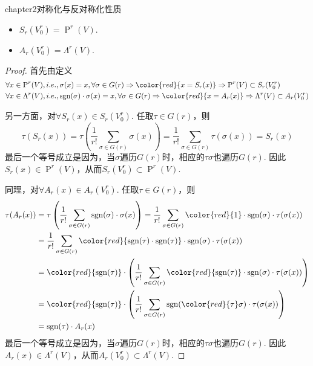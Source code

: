 \begin{mythm}{}{chapter2对称化与反对称化性质}
	\begin{itemize}
	\item[(1)] $S_{r}\left( V^{r}_{0} \right)=\operatorname{P}^{r}(V)$.
	\item[(2)] $A_{r}\left( V^{r}_{0} \right)=\Lambda^{r}(V)$.
	\end{itemize}
\end{mythm}
\begin{proof}
首先由定义
\[
\begin{split}
	&\forall x\in \operatorname{P}^{r}(V),i.e.,\sigma(x)=x,\forall \sigma\in G(r)\Rightarrow {\color{red}{x=S_{r}(x)}}\Rightarrow \operatorname{P}^{r}(V)\subset S_{r}(V^{r}_{0})\\
	&\forall x\in \Lambda^{r}(V),i.e., \operatorname{sgn}(\sigma) \cdot\sigma(x)= x,\forall \sigma\in G(r) \Rightarrow {\color{red}{x=A_{r}(x)}}\Rightarrow \Lambda^{r}(V)\subset A_{r}(V^{r}_{0})
\end{split}
\]

另一方面，对$\forall S_{r}(x)\in S_{r}(V^{r}_{0})$. 任取$\tau\in G(r)$，则
\[
	\tau(S_{r}(x))=\tau \left( \frac{1}{r!}\sum_{\sigma\in G(r)}\sigma(x) \right)=\frac{1}{r!}\sum_{\sigma\in G(r)}\tau(\sigma(x))=S_{r}(x)
\]
最后一个等号成立是因为，当$\sigma$遍历$G(r)$时，相应的$\tau\sigma$也遍历$G(r)$. 因此$S_{r}(x)\in \operatorname{P}^{r}(V)$，从而$ S_{r}(V^{r}_{0})\subset \operatorname{P}^{r}(V)$.

同理，对$\forall A_{r}(x)\in A_{r}(V^{r}_{0})$. 任取$\tau\in G(r)$，则
\[
\begin{split}
\tau(A_{r}(x))&=\tau \left(\frac{1}{r!}\sum_{\sigma\in G(r)}\operatorname{sgn}(\sigma)\cdot \sigma(x)  \right)=\frac{1}{r!}\sum_{\sigma\in G(r)}{\color{red}{1}}\cdot \operatorname{sgn}(\sigma)\cdot \tau(\sigma(x))\\
&=\frac{1}{r!}\sum_{\sigma\in G(r)}{\color{red}{\operatorname{sgn}(\tau)\cdot \operatorname{sgn}(\tau)}}\cdot \operatorname{sgn}(\sigma)\cdot \tau(\sigma(x))\\
&={\color{red}{\operatorname{sgn}(\tau)}}\cdot \left( \frac{1}{r!}\sum_{\sigma\in G(r)}{\color{red}{\operatorname{sgn}(\tau)}}\cdot \operatorname{sgn}(\sigma)\cdot \tau(\sigma(x)) \right)\\
&={\color{red}{\operatorname{sgn}(\tau)}}\cdot \left( \frac{1}{r!}\sum_{\sigma\in G(r)}\operatorname{sgn}({\color{red}{\tau}}\sigma) \cdot \tau(\sigma(x)) \right)\\
&=\operatorname{sgn} (\tau)\cdot A_{r}(x)
\end{split}
\]
最后一个等号成立是因为，当$\sigma$遍历$G(r)$时，相应的$\tau\sigma$也遍历$G(r)$. 因此$A_{r}(x)\in \Lambda^{r}(V)$，从而$ A_{r}(V^{r}_{0})\subset \Lambda^{r}(V)$.
\end{proof}

